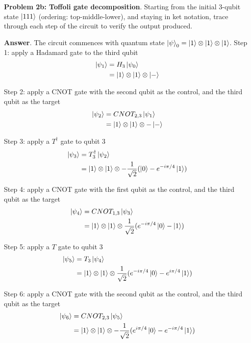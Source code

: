 \textbf{Problem 2b: Toffoli gate decomposition}. Starting from the initial 3-qubit state $\ket{111}$ (ordering: top-middle-lower), and staying in ket
notation, trace through each step of the circuit to verify the output produced.


\textbf{Answer}. The circuit commences with quantum state ${\ket{\psi}_0} = \ket{1} \otimes \ket{1} \otimes \ket{1}$. 
Step 1: apply a Hadamard gate to the third qubit
\begin{align*}
	\ket{\psi_{1}} &= H_{3} \ket{\psi_{0}} \\
	&= \ket{1} \otimes \ket{1} \otimes \ket{-}
\end{align*}

Step 2: apply a CNOT gate with the second qubit as the control, and the third qubit as the target
\begin{align*}
	\ket{\psi_{2}} &= CNOT_{2,3} \ket{\psi_{1}} \\
	&= \ket{1} \otimes \ket{1} \otimes -\ket{-} 
\end{align*}

Step 3: apply a $T^\dag$ gate to qubit 3
\begin{align*}
	\ket{\psi_{3}} &= T_{3}^\dag \ket{\psi_{2}} \\ 
	&= \ket{1} \otimes \ket{1} \otimes -\frac{1}{\sqrt{2}}(\ket{0} - e^{-i\pi/4}\ket{1}) \\
\end{align*}

Step 4: apply a CNOT gate with the first qubit as the control, and the third qubit as the target
\begin{align*}
	\ket{\psi_{4}} &= CNOT_{1,3} \ket{\psi_{3}} \\
	&= \ket{1} \otimes \ket{1} \otimes \frac{1}{\sqrt{2}}(e^{-i\pi/4}\ket{0} - \ket{1}) 
\end{align*}

Step 5: apply a $T$ gate to qubit 3
\begin{align*}
	\ket{\psi_{5}} &= T_3 \ket{\psi_{4}} \\
	&= \ket{1} \otimes \ket{1} \otimes \frac{1}{\sqrt{2}}(e^{-i\pi/4}\ket{0} - e^{i\pi/4}\ket{1})
\end{align*}

Step 6: apply a CNOT gate with the second qubit as the control, and the third qubit as the target
\begin{align*}
	\ket{\psi_{6}} &= CNOT_{2,3} \ket{\psi_{5}} \\
	&= \ket{1} \otimes \ket{1} \otimes -\frac{1}{\sqrt{2}}(e^{i\pi/4}\ket{0} - e^{-i\pi/4}\ket{1})
\end{align*}

